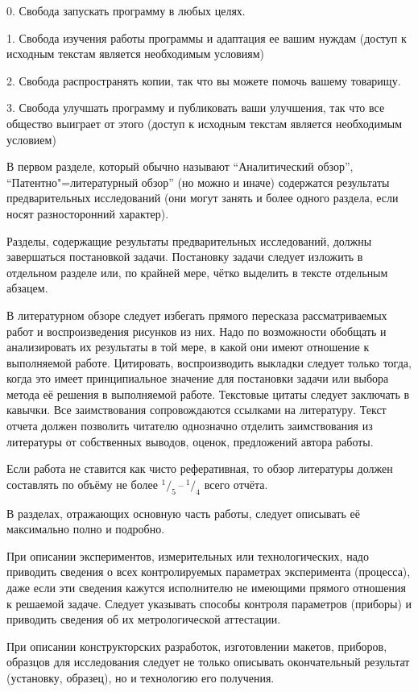\documentclass[utf8,12pt, coursreport]{G7-32}
\begin{document}
0. Свобода запускать программу в любых целях.

1. Свобода изучения работы программы и адаптация ее вашим нуждам (доступ к исходным текстам является необходимым условиям)

2. Свобода распространять копии, так что вы можете помочь вашему товарищу.

3. Свобода улучшать программу и публиковать ваши улучшения, так что все общество выиграет от этого (доступ к исходным текстам является необходимым условием)

В первом разделе, который обычно называют ``Аналитический обзор'', ``Патентно"=литературный обзор'' (но можно и иначе) содержатся результаты предварительных исследований (они могут занять и более одного раздела, если носят разносторонний характер).

Разделы, содержащие результаты предварительных исследований, должны завершаться постановкой задачи. Постановку задачи следует изложить в отдельном разделе или, по крайней мере, чётко выделить в тексте отдельным абзацем.

В литературном обзоре следует избегать прямого пересказа рассматриваемых работ и воспроизведения рисунков из них. Надо по возможности обобщать и анализировать их результаты в той мере, в какой они имеют отношение к выполняемой работе. Цитировать, воспроизводить выкладки следует только тогда, когда это имеет принципиальное значение для постановки задачи или выбора метода её решения в выполняемой работе. Текстовые цитаты следует заключать в кавычки. Все заимствования сопровождаются ссылками на литературу. Текст отчета должен позволить читателю однозначно отделить заимствования из литературы от собственных выводов, оценок, предложений автора работы.

Если работа не ставится как чисто реферативная, то обзор литературы должен составлять по объёму не более $^1/_5$\,--\,$^1/_4$ всего отчёта.

В разделах, отражающих основную часть работы, следует описывать её максимально полно и подробно.

При описании экспериментов, измерительных или технологических, надо приводить сведения о всех контролируемых параметрах эксперимента (процесса), даже если эти сведения кажутся исполнителю не имеющими прямого отношения к решаемой задаче. Следует указывать способы контроля параметров (приборы) и приводить сведения об их метрологической аттестации.

При описании конструкторских разработок, изготовлении макетов, приборов, образцов для исследования следует не только описывать окончательный результат (установку, образец), но и технологию его получения.
\end{document}

